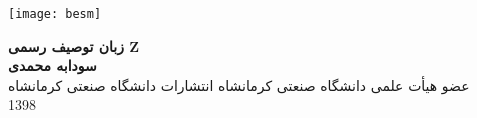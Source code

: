 \cleardoublepage 
\centerline{\texttt{[image: besm]}}
\thispagestyle{empty}
\vspace*{1cm}
\begin{center}
\textbf{{\huge
زبان توصیف رسمی Z
}}
\\\vspace{7cm}
\textbf{\Large  سودابه محمدی}
\\[3mm]
عضو هیأت علمی دانشگاه صنعتی کرمانشاه
\vfill
 انتشارات دانشگاه صنعتی کرمانشاه
\\[2mm]
1398
\end{center}
